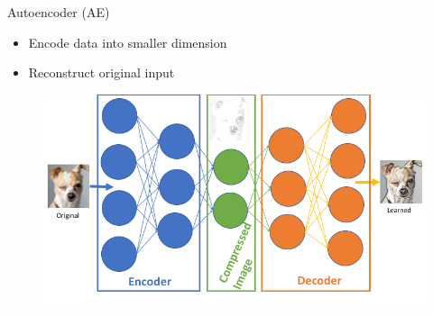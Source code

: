 \documentclass{beamer}
\def \R{\ensuremath \mathbb{R}}
\theoremstyle{definition}
\begin{document}


\begin{frame}{Autoencoder (AE)}
\begin{itemize}
  \item Encode data into smaller dimension
  \item Reconstruct original input
\end{itemize}
\begin{figure}
\includegraphics[width=.7\textwidth]{img/ae_example.png}
\end{figure}
\end{frame}
\end{document}

